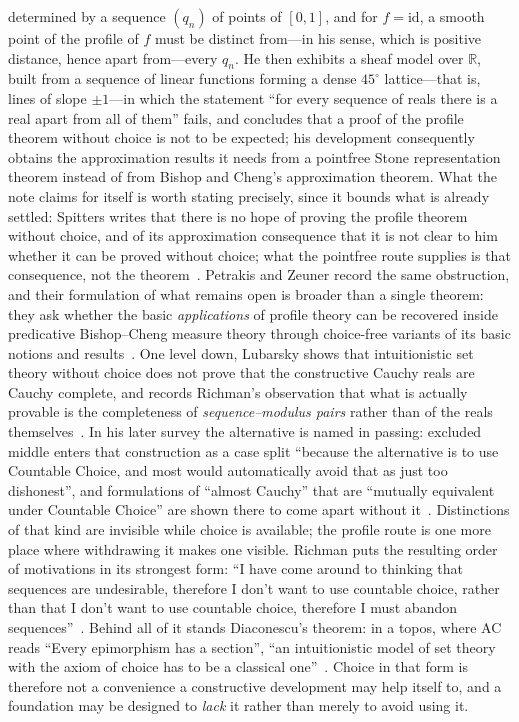 \documentclass[11pt]{article}
\theoremstyle{definition}
\theoremstyle{remark}
\begin{document}
determined by a sequence $(q_n)$ of points of $[0,1]$, and for $f = \mathrm{id}$, a smooth point of the profile of $f$ must be distinct from---in his sense, which is positive distance, hence apart from---every $q_n$.  He then exhibits a sheaf model over $\mathbb{R}$, built from a sequence of linear functions forming a dense $45^\circ$ lattice---that is, lines of slope $\pm1$---in which the statement ``for every sequence of reals there is a real apart from all of them'' fails, and concludes that a proof of the profile theorem without choice is not to be expected; his development consequently obtains the approximation results it needs from a pointfree Stone representation theorem instead of from Bishop and Cheng's approximation theorem.  What the note claims for itself is worth stating precisely, since it bounds what is already settled: Spitters writes that there is no hope of proving the profile theorem without choice, and of its approximation consequence that it is not clear to him whether it can be proved without choice; what the pointfree route supplies is that consequence, not the theorem~\cite{spitters-2006-dagstuhl}.  Petrakis and Zeuner record the same obstruction, and their formulation of what remains open is broader than a single theorem: they ask whether the basic \emph{applications} of profile theory can be recovered inside predicative Bishop--Cheng measure theory through choice-free variants of its basic notions and results~\cite[\S11]{petrakis-zeuner-2024}.  One level down, Lubarsky shows that intuitionistic set theory without choice does not prove that the constructive Cauchy reals are Cauchy complete, and records Richman's observation that what is actually provable is the completeness of \emph{sequence--modulus pairs} rather than of the reals themselves~\cite{lubarsky-2007}.  In his later survey the alternative is named in passing: excluded middle enters that construction as a case split ``because the alternative is to use Countable Choice, and most would automatically avoid that as just too dishonest'', and formulations of ``almost Cauchy'' that are ``mutually equivalent under Countable Choice'' are shown there to come apart without it~\cite[\S22.2.2, \S22.7]{lubarsky-2023}.  Distinctions of that kind are invisible while choice is available; the profile route is one more place where withdrawing it makes one visible.  Richman puts the resulting order of motivations in its strongest form: ``I have come around to thinking that sequences are undesirable, therefore I don't want to use countable choice, rather than that I don't want to use countable choice, therefore I must abandon sequences''~\cite[\S19.2]{richman-2023}.  Behind all of it stands Diaconescu's theorem: in a topos, where AC reads ``Every epimorphism has a section'', ``an intuitionistic model of set theory with the axiom of choice has to be a classical one''~\cite{diaconescu-1975}.  Choice in that form is therefore not a convenience a constructive development may help itself to, and a foundation may be designed to \emph{lack} it rather than merely to avoid using it.
\end{document}

